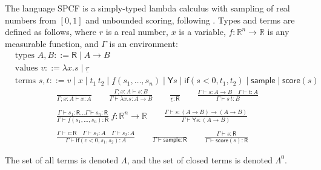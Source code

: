 \documentclass{article}
\newcommand{\tY}{\mathsf{Y}}
\newcommand{\tif}[3]{\mathsf{if}(#1, #2, #3)} %
\newcommand{\tsample}{\mathsf{sample}}
\newcommand{\tscore}{\mathsf{score}}
\theoremstyle{definition}
\theoremstyle{lemma}
\theoremstyle{remark}
\begin{document}
The language SPCF is a simply-typed lambda calculus with sampling of real numbers from $[0,1]$ and unbounded scoring, following \cite{MakOP20b}. Types and terms are defined as follows, where $r$ is a real number, $x$ is a variable, $f : \mathbb{R}^n \to \mathbb{R}$ is any measurable function, and $\Gamma$ is an environment:
\begin{align*}
  & \text{types } A, B ::= \textsf{R}  \mid  A \to B \\
  & \text{values } v ::= \lambda x.s  \mid  \underline{r} \\
  & \text{terms } s, t ::= v  \mid  x  \mid  t_1 \, t_2  \mid  \underline{f}(s_1,\dots ,s_n)  \mid  \tY s  \mid  \tif{s < 0}{t_1}{t_2}  \mid  \tsample  \mid  \tscore(s)
\end{align*}
\begin{align*}
  \frac{}{\Gamma ; x:A \vdash x:A} \qquad
  \frac{\Gamma ; x:A \vdash s : B}{\Gamma \vdash \lambda x.s : A \to B} \qquad
  \frac{}{\underline{r} : \textsf{R}} \qquad
  \frac{\Gamma \vdash s:A \to B \quad \Gamma \vdash t : A}{\Gamma \vdash s \, t : B} \\ \\
  \frac{\Gamma \vdash s_1:\textsf{R} \dots \Gamma \vdash s_n:\textsf{R}}{\Gamma \vdash \underline{f}(s_1,\dots,s_n) : \textsf{R}} \ f : \mathbb{R}^n \to \mathbb{R} \qquad
  \frac{\Gamma \vdash s : (A \to B) \to (A \to B)}{\Gamma \vdash \tY s : (A \to B)} \\ \\
  \frac{\Gamma \vdash c : \textsf{R} \quad \Gamma \vdash s_1 : A \quad \Gamma \vdash s_2 : A}{\Gamma \vdash \tif{c < 0}{s_1}{s_2} : A} \qquad
  \frac{}{\Gamma \vdash \tsample : \textsf{R}} \qquad
  \frac{\Gamma \vdash s : \textsf{R}}{\Gamma \vdash \tscore (s) : \textsf{R}}
\end{align*}

The set of all terms is denoted $\Lambda$, and the set of closed terms is denoted $\Lambda^0$.
\end{document}
